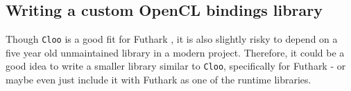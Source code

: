 \subsection{Writing a custom OpenCL bindings library}
Though \texttt{Cloo} is a good fit for Futhark \csharp{}, it is also slightly
risky to depend on a five year old unmaintained library in a modern project.
Therefore, it could be a good idea to write a smaller library similar to
\texttt{Cloo}, specifically for Futhark - or maybe even just include it with
Futhark as one of the \csharp{} runtime libraries. 

